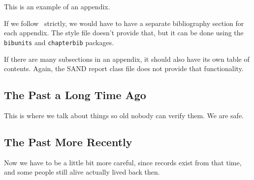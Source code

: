     This is an example of an appendix.

    If we follow~\cite{Sand98-0730} strictly, we would have to have
    a separate bibliography section for each appendix.  The style
    file doesn't provide that, but it can be done using the {\tt
    bibunits} and {\tt chapterbib} packages.

    If there are many subsections in an appendix, it should also
    have its own table of contents. Again, the SAND report class
    file does not provide that functionality.

	\subsection{The Past a Long Time Ago}
	This is where we talk about things so old nobody can verify
	them. We are safe.

	\subsection{The Past More Recently}
	Now we have to be a little bit more careful, since records
	exist from that time, and some people still alive actually
	lived back then.
